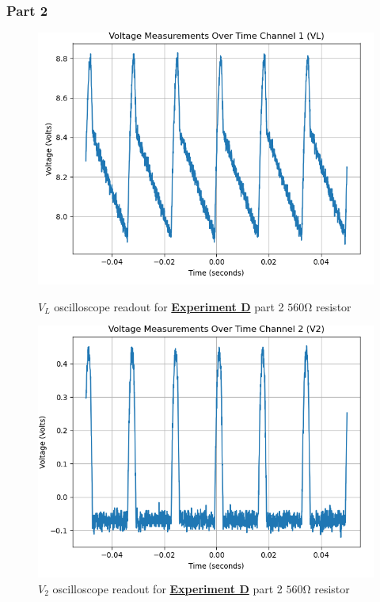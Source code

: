 \documentclass[
	letterpaper
	12pt
]{template}
\newcommand{\bref}[2]{\textbf{\hyperref[#1]{#2}}}
\begin{document}
\subsubsection{Part 2}
\begin{figure}[H]\label{data::D4}
	\centering
	\begin{minipage}[c]{0.45\textwidth}
		\centering
		\includegraphics[width=\textwidth]{figures/D/4--ch1.png}
	    \caption{$V_{L}$ oscilloscope readout for \bref{exp::D}{Experiment D} part 2 $560\unit{\ohm}$ resistor}
	\end{minipage}
	\hfill
	\begin{minipage}[c]{0.45\textwidth}
		\centering
		\includegraphics[width=\textwidth]{figures/D/4--ch2.png}
	    \caption{$V_{2}$ oscilloscope readout for \bref{exp::D}{Experiment D} part 2 $560\unit{\ohm}$ resistor}
	\end{minipage}
\end{figure}
\end{document}
